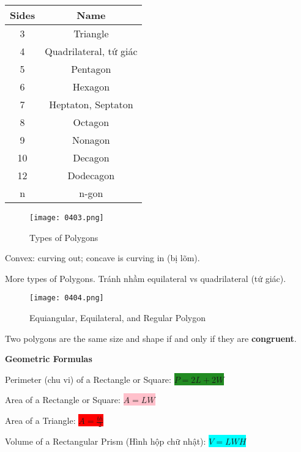 \begin{center}
\begin{tabular}{ c | c }
  \textbf{Sides} & \textbf{Name} \\
  \hline
  3 & Triangle \\
  4 & Quadrilateral, tứ giác \\
  5 & Pentagon \\
  6 & Hexagon \\
  7 & Heptaton, Septaton \\
  8 & Octagon \\
  9 & Nonagon \\
  10 & Decagon \\
  12 & Dodecagon \\
  n & n-gon \\
\end{tabular}
\end{center}

\begin{figure}[htb!]
  \centering
  \texttt{[image: 0403.png]}
  \caption{Types of Polygons}
\end{figure}

Convex: curving out; concave is curving in (bị lõm).

\vspace{1cm}

\newpage

More types of Polygons. Tránh nhầm equilateral vs quadrilateral (tứ giác).

\begin{figure}[htb!]
  \centering
  \texttt{[image: 0404.png]}
  \caption{Equiangular, Equilateral, and Regular Polygon}
\end{figure}

Two polygons are the same size and shape if and only if they are \textbf{congruent}.

\vspace{0.6 cm}

\centerline{\textbf{\huge Geometric Formulas}}

\vspace{0.2 cm}

Perimeter (chu vi) of a Rectangle or Square: \colorbox{ForestGreen}{$P=2L+2W$}

Area of a Rectangle or Square: \colorbox{pink}{$A=LW$}

Area of a Triangle: \colorbox{red}{$A=\frac{bh}{2}$}

Volume of a Rectangular Prism (Hình hộp chữ nhật): \colorbox{cyan}{$V=LWH$}


